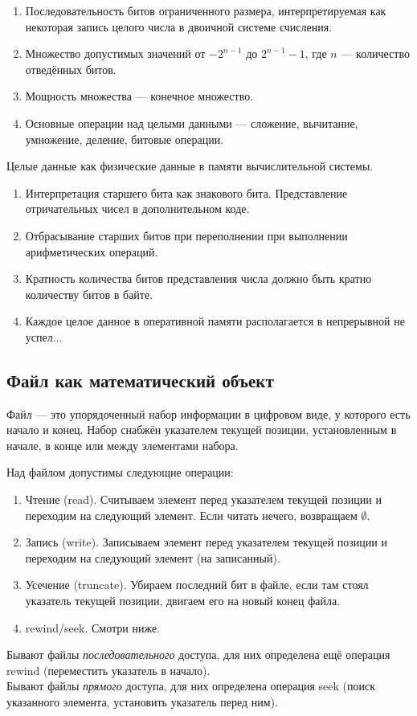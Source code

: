 \documentclass[12pt, a4paper]{article}
\begin{document}
    \begin{enumerate}
        \item Последовательность битов ограниченного размера, интерпретируемая как некоторая запись целого числа в двоичной системе счисления.
        \item Множество допустимых значений от $-2^{n - 1}$ до $2^{n - 1} - 1$, где $n$ --- количество отведённых битов.
        \item Мощность множества --- конечное множество.
        \item Основные операции над целыми данными --- сложение, вычитание, умножение, деление, битовые операции.
    \end{enumerate}
    \begin{center}
        Целые данные как физические данные в памяти вычислительной системы.
    \end{center}
    \begin{enumerate}
        \item Интерпретация старшего бита как знакового бита. Представление отричательных чисел в дополнительном коде.
        \item Отбрасывание старших битов при переполнении при выполнении арифметических операций.
        \item Кратность количества битов представления числа должно быть кратно количеству битов в байте.
        \item Каждое целое данное в оперативной памяти располагается в непрерывной не успел...
    \end{enumerate}
    \subsection{Файл как математический объект}
    Файл --- это упорядоченный набор информации в цифровом виде, у которого есть начало и конец. Набор снабжён указателем текущей позиции, установленным в начале, в конце или между элементами набора.
    \begin{center}
        Над файлом допустимы следующие операции:
    \end{center}
    \begin{enumerate}
        \item Чтение (read). Считываем элемент перед указателем текущей позиции и переходим на следующий элемент. Если читать нечего, возвращаем $\emptyset$.
        \item Запись (write). Записываем элемент перед указателем текущей позиции и переходим на следующий элемент (на записанный).
        \item Усечение (truncate). Убираем последний бит в файле, если там стоял указатель текущей позиции, двигаем его на новый конец файла.
        \item rewind/seek. Смотри ниже.
    \end{enumerate}
    Бывают файлы \textit{последовательного} доступа, для них определена ещё операция rewind (переместить указатель в начало).\\
    Бывают файлы \textit{прямого} доступа, для них определена операция seek (поиск указанного элемента, установить указатель перед ним).
\end{document}
